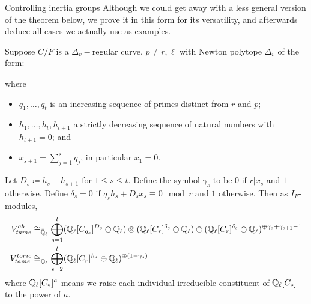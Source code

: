\documentclass[11pt,a4paper]{article}
\newcommand{\Dv}{\Delta_v}
\newcommand{\F}{\mathcal{F}}
\begin{document}
\begin{section}{Controlling inertia groups}
Although we could get away with a less general version of the theorem below, we prove it in this form for its versatility, and afterwards deduce  all cases we actually use as examples. 

\begin{theorem}
\label{inertia_action_from_polytope}
Suppose $C/F$ is a $\Delta_v-$regular curve, $p \neq r,\ell$ with Newton polytope $\Dv$ of the form:
\begin{center}
\end{center}
where
\begin{itemize}
    \item $q_1 , \ldots , q_t$ is an increasing sequence of primes distinct from $r$ and $p$;
    \item $h_1, \ldots, h_t, h_{t+1}$ a strictly decreasing sequence of natural numbers with $h_{t+1}=0$; and


\item $x_{s+1} = \sum^{s}_{j=1}q_{j}$, in particular $x_1 =0$. %
\end{itemize}


Let $D_s\coloneqq h_s - h_{s+1}$ for $1\leq s\leq t$.
Define the symbol $\gamma_s$ to be $0$ if $r|x_{s}$ and $ 1$ otherwise.
Define $\delta_s = 0$ if $q_sh_s+D_sx_s \equiv 0 \mod{r}$  and $1$ otherwise.
Then as $I_F$-modules,
\begin{align*}
V^{ab}_{tame}  & \cong_{\Bar{\mathbb{Q}}_\ell} \bigoplus^t_{s=1}  (\mathbb{Q}_\ell[C_{q_s}]^{D_s} \ominus \mathbb{Q}_\ell )\otimes (\mathbb{Q}_\ell[C_{r}]^{\delta_s}  \ominus \mathbb{Q}_\ell) \oplus (\mathbb{Q}_\ell[C_{r}]^{\delta_s} \ominus \mathbb{Q}_\ell)^{\oplus \gamma_s + \gamma_{s+1} -1}  \\
V^{toric}_{tame} & \cong_{\Bar{\mathbb{Q}}_\ell} \bigoplus_{s=2}^{t}(\mathbb{Q}_\ell[C_{r}]^{h_{s}} \ominus \mathbb{Q}_\ell)^{\oplus(1- \gamma_{s})} 
\end{align*}
 where $\mathbb{Q}_\ell[C_{*}]^{a}$ means we raise each individual irreducible constituent of $\mathbb{Q}_\ell[C_{*}]$ to the power of $a$. 
 

\end{theorem}
\end{section}
\end{document}
